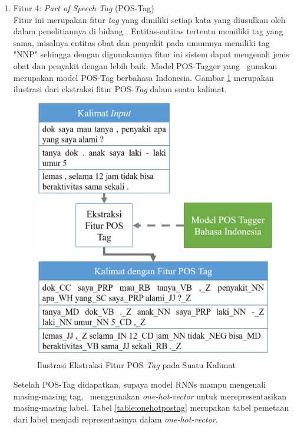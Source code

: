 \begin{enumerate}
	\item Fitur 4: \textit{Part of Speech Tag} (POS-Tag)\\
	Fitur ini merupakan fitur \textit{tag} yang dimiliki setiap kata yang diusulkan oleh \cite{abacha2011medical} dalam penelitiannya di bidang \mer. Entitas-entitas tertentu memiliki tag yang sama, misalnya entitas obat dan penyakit pada umumnya memiliki tag "NNP" sehingga dengan digunakannya fitur ini sistem dapat mengenali jenis obat dan penyakit dengan lebih baik. Model POS-Tagger yang \saya~gunakan merupakan model POS-Tag berbahasa Indonesia. Gambar \ref{fig:fiturpostag} merupakan ilustrasi dari ekstraksi fitur POS-\textit{Tag} dalam suatu kalimat.
	
	\begin{figure}
		\centering
		\includegraphics[width=0.70\linewidth]{images/fiturpostag}
		\caption{Ilustrasi Ekstraksi Fitur POS \textit{Tag} pada Suatu Kalimat}
		\label{fig:fiturpostag}
	\end{figure}
	
	Setelah POS-Tag didapatkan, supaya model RNNs mampu mengenali masing-masing tag, \saya~menggunakan \textit{one-hot-vector} untuk merepresentasikan masing-masing label. Tabel \ref{table:onehotpostag} merupakan tabel pemetaan dari label menjadi representasinya dalam \textit{one-hot-vector}.
	

\end{enumerate}
